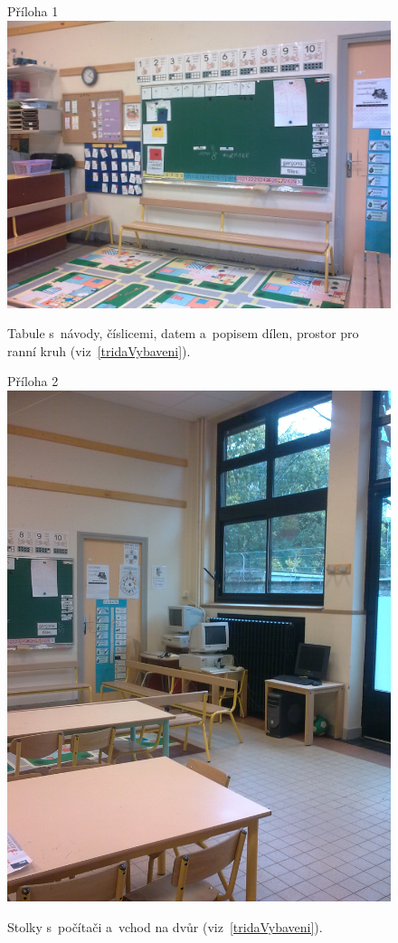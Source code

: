 	\begin{figure}[tb]
		\centering
		Příloha 1\\
		\includegraphics[height = 0.35\textheight]{./fotky/Obr1.jpg}
		\caption{
			Tabule s~návody, číslicemi, datem a~popisem dílen, prostor pro ranní kruh (viz~\ref{tridaVybaveni}).
		}
		\label{Obr1}
	\end{figure}

	\begin{figure}[tb]
		\centering
		Příloha 2\\
		\includegraphics[height = 0.35\textheight]{./fotky/Obr2.jpg}
		\caption{
			Stolky s~počítači a~vchod na dvůr (viz~\ref{tridaVybaveni}).
		}
		\label{Obr2}
	\end{figure}

